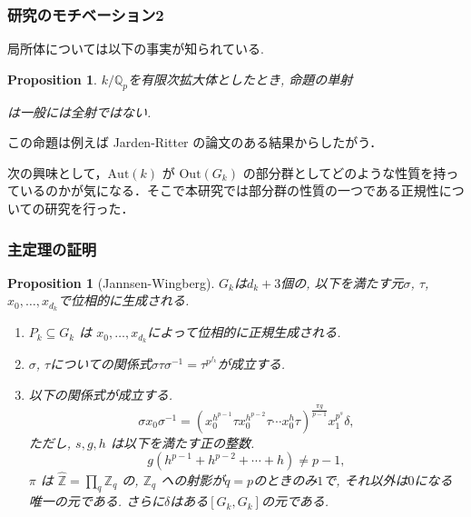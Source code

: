 \documentclass[dvipdfmx,19.8pt]{beamer}
\theoremstyle{theorem}
\newtheorem{prop}[theorem]{Proposition}
\theoremstyle{definition}
\def\bZ{{\mathbb Z}}
\def\bQ{{\mathbb Q}}
\def\Aut{{\mathrm{Aut}}}
\def\Out{{\mathrm{Out}}}
\begin{document}
\begin{frame}[fragile]

  \frametitle{研究のモチベーション2}
局所体については以下の事実が知られている. 
\begin{prop}
$k/\bQ_p$を有限次拡大体としたとき, 命題\upshape{ \ref{injective:prop} }の単射
は一般には全射ではない. 
\end{prop}
この命題は例えば Jarden-Ritter の論文\cite{JR}のある結果からしたがう．


次の興味として，$\Aut(k)$ が $\Out(G_k)$ の部分群としてどのような性質を持っているのかが気になる．そこで本研究では部分群の性質の一つである正規性についての研究を行った．

\end{frame}









\begin{frame}[fragile]
	\frametitle{主定理の証明}
\begin{prop}[Jannsen-Wingberg]
$G_k$は$d_k+3$個の, 以下を満たす元$\sigma$, $\tau$, $x_0, \dots, x_{d_k}$で位相的に生成される. 
\begin{enumerate}[label=(\roman*),ref=(\roman*)]
  \item[\rm (1)]  $P_k \subseteq G_k$ は $x_0, \dots, x_{d_k}$によって位相的に正規生成される.
  \item[\rm (2)]  $\sigma$, $\tau$についての関係式$\sigma \tau \sigma^{-1} = \tau^{p^{f_k}}$が成立する.
  \item[\rm (3)] 以下の関係式が成立する.  
\[
\sigma x_0 \sigma^{-1}
=
(x^{h^{{p}-1}}_0 \tau x^{h^{{p}-2}}_0 \tau \cdots x^{h}_0 \tau)^{\frac{\pi g}{{p}-1}}
x_1^{p^s}
\delta ,
\]
ただし, $s, g, h$ は以下を満たす正の整数.  
\[
g(h^{p - 1} + h^{p - 2} + \cdots + h) \neq p - 1, 
\]
$\pi$ は $\hat{\bZ} = \prod_q \bZ_q$ の,  $\bZ_q$ ヘの射影が$q = p$のときのみ$1$で, それ以外は$0$になる唯一の元である. さらに$\delta$はある$[G_k,G_k]$の元である.


\end{enumerate}
\end{prop}



\end{frame}
\end{document}

